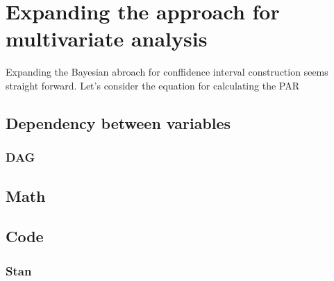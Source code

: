 \chapter{Expanding the approach for multivariate analysis} \label{Expanding}
Expanding the Bayesian abroach for conffidence interval construction seems straight forward. Let's consider the equation for calculating the PAR 

\section{Dependency between variables}
\subsection{DAG}\label{DAG}
\section{Math}\label{Math}
\section{Code}\label{Code}
\subsection{Stan}\label{codeInStan}